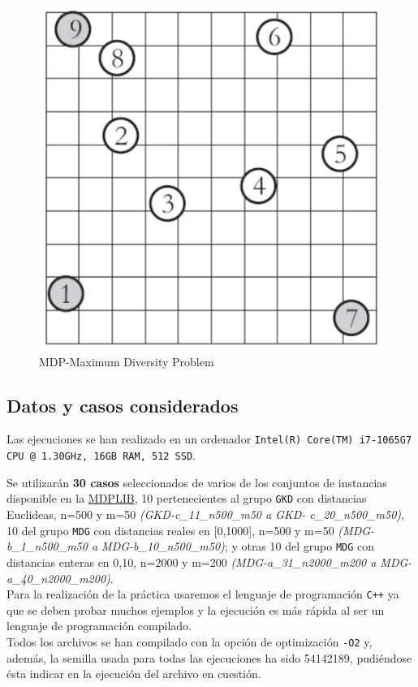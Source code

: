 \begin{figure}[H]
	\centering
	\includegraphics[scale=0.35]{img/mdp.png}
	\caption{MDP-Maximum Diversity Problem}
\end{figure}


\newpage
\subsection{Datos y casos considerados}
\hspace{1.5cm} Las ejecuciones se han realizado en un ordenador \texttt{Intel(R) Core(TM) i7-1065G7 CPU @ 1.30GHz, 16GB RAM, 512 SSD}. 


Se utilizarán \textbf{30 casos} seleccionados de varios de los conjuntos de instancias disponible en la \href{http://www.optsicom.es/mdp/}{MDPLIB}, 10 pertenecientes al grupo \texttt{GKD} con distancias Euclideas, n=500 y m=50 \textit{(GKD-c\_11\_n500\_m50 a GKD-
c\_20\_n500\_m50)}, 10 del grupo \texttt{MDG} con distancias reales en [0,1000], n=500 y m=50
\textit{(MDG-b\_1\_n500\_m50 a MDG-b\_10\_n500\_m50)}; y otras 10 del grupo \texttt{MDG} con distancias enteras en {0,10}, n=2000 y m=200 \textit{(MDG-a\_31\_n2000\_m200 a MDG-
a\_40\_n2000\_m200)}. \\


Para la realización de la práctica usaremos el lenguaje de programación \texttt{C++} ya que se deben probar muchos ejemplos y la ejecución es más rápida al ser un lenguaje de programación compilado. \\
Todos los archivos se han compilado con la opción de optimización \texttt{-O2} y, además,  la semilla usada para todas
las ejecuciones ha sido 54142189, pudiéndose ésta indicar en la ejecución del archivo en cuestión. 







